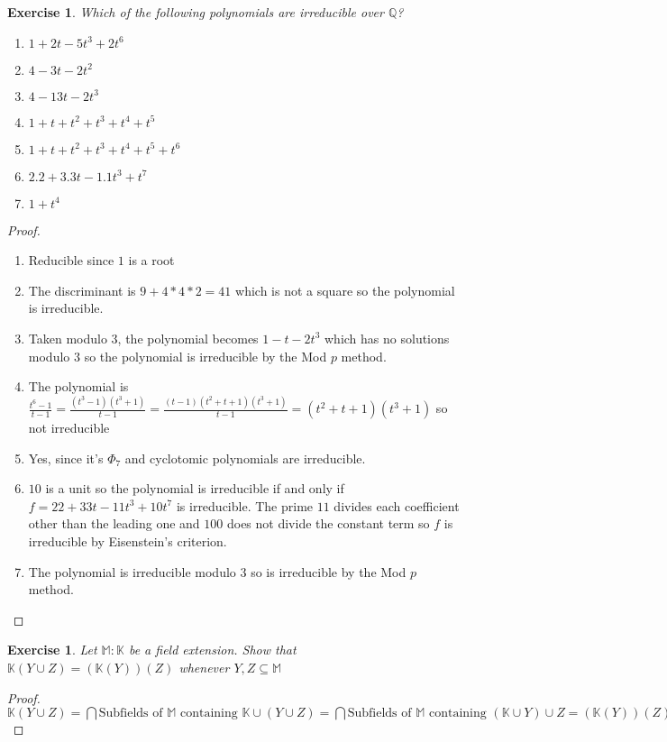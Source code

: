 \documentclass{article}
\newtheorem{exercise}[theorem]{Exercise}
\begin{document}
\begin{exercise}
Which of the following polynomials are irreducible over $\mathbb{Q}$?
\begin{enumerate}[label=(\roman*)]
    \item $1+2t-5t^3+2t^6$
    \item $4-3t-2t^2$
    \item $4-13t-2t^3$
    \item $1+t+t^2+t^3+t^4+t^5$
    \item $1+t+t^2+t^3+t^4+t^5+t^6$
    \item $2.2+3.3t-1.1t^3+t^7$
    \item $1+t^4$
\end{enumerate}
\end{exercise}
\begin{proof}
\begin{enumerate}[label=(\roman*)]
    \item Reducible since $1$ is a root
    \item The discriminant is $9+4*4*2=41$ which is not a square so the polynomial is irreducible.
    \item Taken modulo $3$, the polynomial becomes $1-t-2t^3$ which has no solutions modulo $3$ so the polynomial is irreducible by the Mod $p$ method.
    \item The polynomial is $\frac{t^6-1}{t-1}=\frac{(t^3-1)(t^3+1)}{t-1}=\frac{(t-1)(t^2+t+1)(t^3+1)}{t-1}=(t^2+t+1)(t^3+1)$ so not irreducible
    \item Yes, since it's $\Phi_7$ and cyclotomic polynomials are irreducible.
    \item $10$ is a unit so the polynomial is irreducible if and only if $f=22+33t-11t^3+10t^7$ is irreducible. The prime $11$ divides each coefficient other than the leading one and $100$ does not divide the constant term so $f$ is irreducible by Eisenstein's criterion.
    \item The polynomial is irreducible modulo $3$ so is irreducible by the Mod $p$ method.
\end{enumerate}
\end{proof}

\begin{exercise}
Let $\mathbb{M}:\mathbb{K}$ be a field extension. Show that $\mathbb{K}(Y\cup Z)=(\mathbb{K}(Y))(Z)$ whenever $Y,Z\subseteq \mathbb{M}$
\end{exercise}
\begin{proof}
$\mathbb{K}(Y\cup Z)=\bigcap \text{Subfields of }\mathbb{M}\text{ containing }\mathbb{K}\cup(Y\cup Z)=\bigcap \text{Subfields of }\mathbb{M}\text{ containing }(\mathbb{K}\cup Y)\cup Z=(\mathbb{K}(Y))(Z)$
\end{proof}
\end{document}
